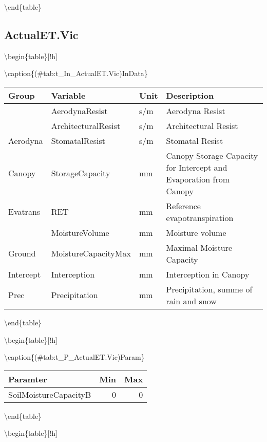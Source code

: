 \documentclass[
]{book}
\begin{document}
\textbackslash end\{table\}

\hypertarget{actualet.vic}{%
\subsection{ActualET.Vic}\label{actualet.vic}}

\textbackslash begin\{table\}{[}!h{]}

\textbackslash caption\{(\#tab:t\_In\_ActualET.Vic)InData\}
\centering

\begin{tabular}[t]{l|l|l|l}
\hline
Group & Variable & Unit & Description\\
\hline
 & AerodynaResist & s/m & Aerodyna Resist\\
\cline{2-4}
 & ArchitecturalResist & s/m & Architectural Resist\\
\cline{2-4}
\multirow{-3}{*}{\raggedright\arraybackslash Aerodyna} & StomatalResist & s/m & Stomatal Resist\\
\cline{1-4}
Canopy & StorageCapacity & mm & Canopy Storage Capacity for Intercept and Evaporation from Canopy\\
\cline{1-4}
Evatrans & RET & mm & Reference evapotranspiration\\
\cline{1-4}
 & MoistureVolume & mm & Moisture volume\\
\cline{2-4}
\multirow{-2}{*}{\raggedright\arraybackslash Ground} & MoistureCapacityMax & mm & Maximal Moisture Capacity\\
\cline{1-4}
Intercept & Interception & mm & Interception in Canopy\\
\cline{1-4}
Prec & Precipitation & mm & Precipitation, summe of rain and snow\\
\hline
\end{tabular}

\textbackslash end\{table\}

\textbackslash begin\{table\}{[}!h{]}

\textbackslash caption\{(\#tab:t\_P\_ActualET.Vic)Param\}
\centering

\begin{tabular}[t]{l|r|r}
\hline
Paramter & Min & Max\\
\hline
SoilMoistureCapacityB & 0 & 0\\
\hline
\end{tabular}

\textbackslash end\{table\}

\textbackslash begin\{table\}{[}!h{]}
\end{document}
